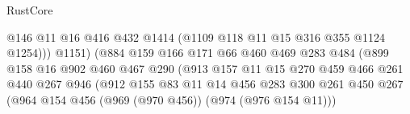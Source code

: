 \begin{lexlean}{RustCore}
\begin{coremodule}
                                              @146
                                              @11
                                              @16
                                              @416
                                              @432
                                              @1414
                                              (@1109 @118 @11 @15 @316 @355 @1124 @1254)))
                                          @1151)
                                        (@884
                                          @159
                                          @166
                                          @171
                                          @66
                                          @460
                                          @469
                                          @283
                                          @484
                                          (@899
                                            @158
                                            @16
                                            @902
                                            @460
                                            @467
                                            @290
                                            (@913
                                              @157
                                              @11
                                              @15
                                              @270
                                              @459
                                              @466
                                              @261
                                              @440
                                              @267
                                              @946
                                              (@912
                                                @155
                                                @83
                                                @11
                                                @14
                                                @456
                                                @283
                                                @300
                                                @261
                                                @450
                                                @267
                                                (@964
                                                  @154
                                                  @456
                                                  (@969 (@970 @456))
                                                  (@974 (@976 @154 @11)))

\end{coremodule}
\end{lexlean}

